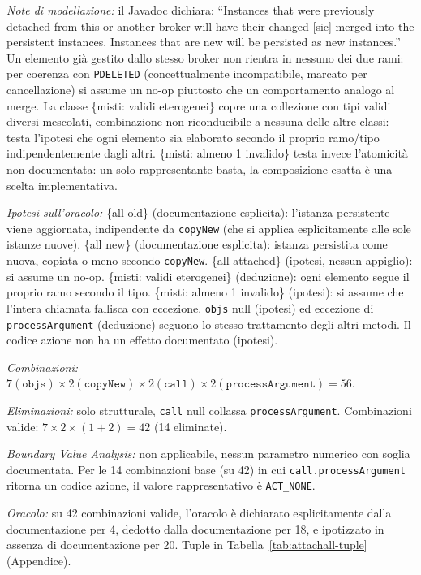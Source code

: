\textit{Note di modellazione:} il Javadoc dichiara: ``Instances that were previously detached
from this or another broker will have their changed [sic] merged into the persistent instances.
Instances that are new will be persisted as new instances.'' Un elemento già gestito dallo
stesso broker non rientra in nessuno dei due rami: per coerenza con \texttt{PDELETED}
(concettualmente incompatibile, marcato per cancellazione) si assume un no-op piuttosto che un
comportamento analogo al merge. La classe \{misti: validi eterogenei\} copre una collezione con
tipi validi diversi mescolati, combinazione non riconducibile a nessuna delle altre classi: testa
l'ipotesi che ogni elemento sia elaborato secondo il proprio ramo/tipo indipendentemente dagli
altri. \{misti: almeno 1 invalido\} testa invece l'atomicità non
documentata: un solo rappresentante basta, la composizione esatta è una scelta implementativa.

\textit{Ipotesi sull'oracolo:} \{all old\} (documentazione esplicita): l'istanza persistente
viene aggiornata, indipendente da \texttt{copyNew} (che si applica esplicitamente alle sole
istanze nuove). \{all new\} (documentazione esplicita): istanza persistita come nuova, copiata o
meno secondo \texttt{copyNew}. \{all
attached\} (ipotesi, nessun appiglio): si assume un no-op. \{misti: validi eterogenei\}
(deduzione): ogni elemento segue il proprio ramo secondo il tipo. \{misti: almeno 1 invalido\}
(ipotesi): si assume che l'intera chiamata fallisca con eccezione. \texttt{objs} null (ipotesi)
ed eccezione di \texttt{processArgument} (deduzione) seguono lo stesso trattamento degli altri
metodi. Il codice azione non ha un effetto documentato (ipotesi).

\textit{Combinazioni:} $7 (\texttt{objs}) \times 2 (\texttt{copyNew}) \times 2 (\texttt{call})
\times 2 (\texttt{processArgument}) = 56$.

\textit{Eliminazioni:} solo strutturale, \texttt{call} null collassa \texttt{processArgument}.
Combinazioni valide: $7 \times 2 \times (1+2) = 42$ (14 eliminate).

\textit{Boundary Value Analysis:} non applicabile, nessun parametro numerico con soglia
documentata. Per le 14 combinazioni base (su 42) in cui \texttt{call.processArgument} ritorna un
codice azione, il valore rappresentativo è \texttt{ACT\_NONE}.

\textit{Oracolo:} su 42 combinazioni valide, l'oracolo è dichiarato esplicitamente dalla
documentazione per 4, dedotto dalla documentazione per 18, e ipotizzato in assenza di
documentazione per 20. Tuple in Tabella~\ref{tab:attachall-tuple} (Appendice).

